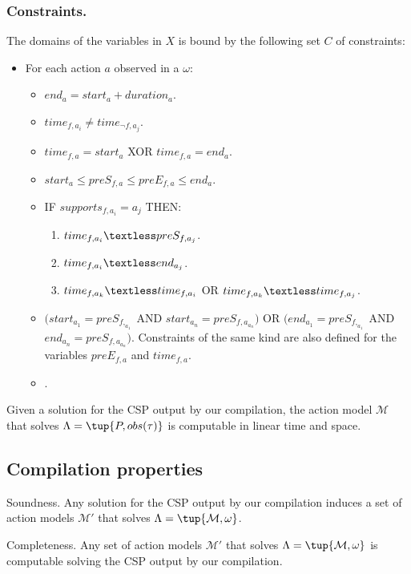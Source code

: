 \documentclass[runningheads]{llncs}
\begin{document}
\subsubsection{Constraints.} The domains of the variables in $X$ is bound by the following set $C$ of constraints:
\begin{itemize}
\item For each action $a$ observed in a $\omega$:
\begin{itemize}
\item $end_a = start_a + duration_a$.
\item $time_{f,a_i}\neq time_{\neg f,a_j}$.
\item $time_{f,a}= start_a$ XOR $time_{f,a}= end_a$.
\item $start_a\leq preS_{f,a}\leq preE_{f,a}\leq end_a$.
\item IF $supports_{f,a_i}=a_j$ THEN:
\begin{enumerate}
\item $time_{f,a_i}\textless  preS_{f,a_j}$.
\item $time_{f,a_i}\textless  end_{a_j}$.
\item $time_{f,a_k}\textless time_{f,a_i}$ OR $time_{f,a_k}\textless time_{f,a_j}$.
\end{enumerate}
\item $(start_{a_1} = preS_{f,_{a_1}}$ AND $start_{a_n} = preS_{f,a_{a_n}})$ OR $(end_{a_1} = preS_{f,_{a_1}}$ AND $end_{a_n} = preS_{f,a_{a_n}})$. Constraints of the same kind are also defined for the variables $preE_{f,a}$ and $time_{f,a}$.
\item .
\end{itemize}
\end{itemize}

Given a solution for the CSP output by our compilation, the action model $\mathcal{M}$ that solves $\Lambda=\tup{P,obs(\tau)}$ is computable in linear time and space.


\subsection{Compilation properties}
\begin{lemma}
Soundness. Any solution for the CSP output by our compilation induces a set of action models $\mathcal{M}'$ that solves $\Lambda=\tup{\mathcal{M},\omega}$.
\end{lemma}


\begin{lemma}
Completeness. Any set of action models $\mathcal{M}'$ that solves $\Lambda=\tup{\mathcal{M},\omega}$ is computable solving the CSP output by our compilation.
\end{lemma}
\end{document}
